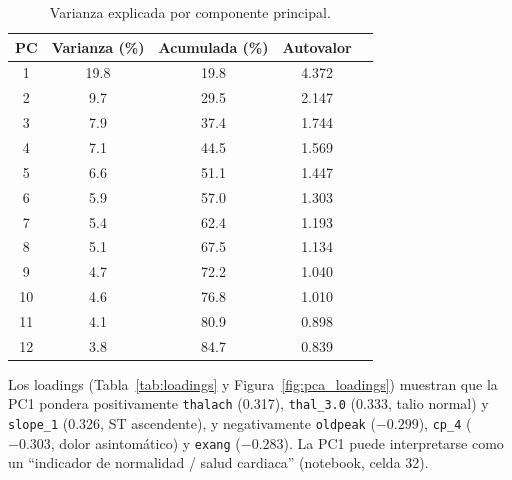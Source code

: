 \documentclass[11pt,a4paper]{article}
\begin{document}
\begin{table}[H]
  \centering
  \caption{Varianza explicada por componente principal.}
  \label{tab:pca}
  \small
  \begin{tabular}{@{}ccccc@{}}
    \toprule
    \textbf{PC} & \textbf{Varianza (\%)} & \textbf{Acumulada (\%)} & \textbf{Autovalor} \\
    \midrule
    1 & 19.8 & 19.8 & 4.372 \\
    2 & 9.7 & 29.5 & 2.147 \\
    3 & 7.9 & 37.4 & 1.744 \\
    4 & 7.1 & 44.5 & 1.569 \\
    5 & 6.6 & 51.1 & 1.447 \\
    6 & 5.9 & 57.0 & 1.303 \\
    7 & 5.4 & 62.4 & 1.193 \\
    8 & 5.1 & 67.5 & 1.134 \\
    9 & 4.7 & 72.2 & 1.040 \\
    10 & 4.6 & 76.8 & 1.010 \\
    11 & 4.1 & 80.9 & 0.898 \\
    12 & 3.8 & 84.7 & 0.839 \\
    \bottomrule
  \end{tabular}
\end{table}

Los loadings (Tabla~\ref{tab:loadings} y Figura~\ref{fig:pca_loadings}) muestran que la
PC1 pondera positivamente \texttt{thalach} (0.317), \texttt{thal\_3.0} (0.333, talio normal) y
\texttt{slope\_1} (0.326, ST ascendente), y negativamente \texttt{oldpeak} ($-0.299$),
\texttt{cp\_4} ($-0.303$, dolor asintomático) y \texttt{exang} ($-0.283$). La PC1 puede
interpretarse como un ``indicador de normalidad / salud cardiaca'' (notebook, celda 32).
\end{document}
